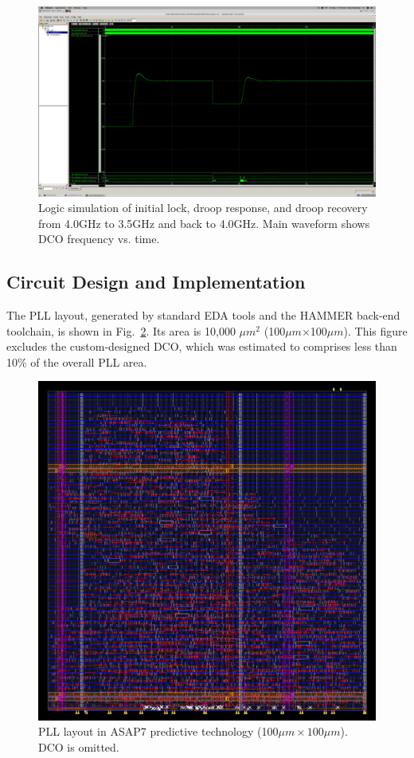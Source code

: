 \documentclass[twoside,9pt,journal,letterpage]{IEEEtran}
\begin{document}
\begin{figure}[h]
	\centering
	\includegraphics[width=\columnwidth]{brake1.png}
	\caption{Logic simulation of initial lock, droop response, and droop recovery from 4.0GHz to 3.5GHz and back to 4.0GHz. Main waveform shows DCO frequency vs. time.}
	\label{fig:brake}
\end{figure}

\vspace{-7pt}
\subsection{Circuit Design and Implementation}
\label{sec:circuit_design}

The PLL layout, generated by standard EDA tools and the HAMMER \cite{wanghammer} back-end toolchain, is shown in Fig.\ \ref{fig:layout}. Its area is 10,000 $\mu m^2$ (100$\mu m$$\times$100$\mu m$). This figure excludes the custom-designed DCO, which was estimated to comprises less than 10\% of the overall PLL area.


\begin{figure}[h]
	\centering
	\includegraphics[width=0.7\columnwidth]{pnr3.png}
	\caption{PLL layout in ASAP7 predictive technology (100$\mu m\times100\mu m$). DCO is omitted.}
	\label{fig:layout}
\end{figure}
\end{document}
